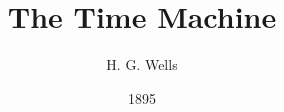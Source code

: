

\usepackage[hybrid]{markdown}

\usepackage[english]{babel}




\newcommand{\s}[1]{\ifvmode{}\else{\par}\fi—#1}



\title{The Time Machine}
\author{H. G. Wells}
\date{1895}


\usepackage[
    paperwidth=110mm,
    paperheight=178mm,
    top=1.8cm,
    left=1cm,
    right=1cm,
    bottom=2.25cm,
    bindingoffset=5mm
]{geometry}


\usepackage[automark]{scrlayer-scrpage}
\clearpairofpagestyles
\cfoot*{\pagemark}
\renewcommand{\headfont}{\scshape}
\chead{\headmark}
\renewcommand*\chaptermarkformat{\chapterformat : }



\usepackage{relsize}
\renewcommand{\chapterlineswithprefixformat}[3]{%
    {\centering%
        \IfArgIsEmpty{#2}{%
            #3%
        }{
            \ifdef{\liningnums}{%
                \liningnums{#2}%
            }{%
                #2%
            }%
            \relsize{-1.2}{#3}%
        }%
    }%
}


\usepackage{ebgaramond}

\parskip=0.5mm
